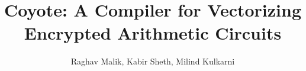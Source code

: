 \documentclass[pageno]{jpaper}
\title{Coyote: A Compiler for Vectorizing Encrypted Arithmetic Circuits}
\author{Raghav Malik, Kabir Sheth, Milind Kulkarni}
\begin{document}

\maketitle









\pagebreak
\clearpage
% 


\end{document}
